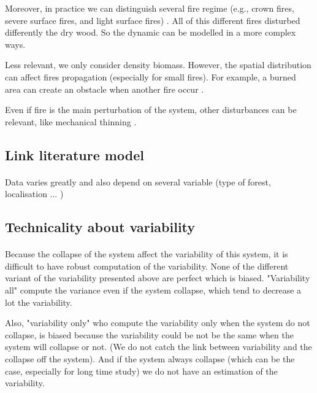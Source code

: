 \documentclass{article}
\begin{document}
Moreover, in practice we can distinguish several fire regime (e.g., crown fires, severe surface fires, and light surface fires) \cite{reichle_fire_1981}. All of this different fires disturbed differently the dry wood. So the dynamic can be modelled in a more complex ways.

Less relevant, we only consider density biomass. However, the spatial distribution can affect fires propagation (especially for small fires). For example, a burned area can create an obstacle when another fire occur \cite{bergeron_natural_2002}.

Even if fire is the main perturbation of the system, other disturbances can be relevant, like mechanical thinning \cite{liu_analyzing_2010}\cite{schoennagel_interaction_2004}\cite{wimberly_assessing_2009}.


\subsection{Link literature model}

\paragraph{}
Data varies greatly and also depend on several variable (type of forest, localisation ... )


\subsection{Technicality about variability}

\paragraph{}
Because the collapse of the system affect the variability of this system, it is difficult to have robust computation of the variability. None of the different variant of the variability presented above are perfect which is biased. "Variability all" compute the variance even if the system collapse, which tend to decrease a lot the variability. 
    
Also, "variability only" who compute the variability only when the system do not collapse, is biased because the variability could be not be the same when the system will collapse or not. (We do not catch the link between variability and the collapse off the system). And if the system always collapse (which can be the case, especially for long time study) we do not have an estimation of the variability. 
\end{document}
